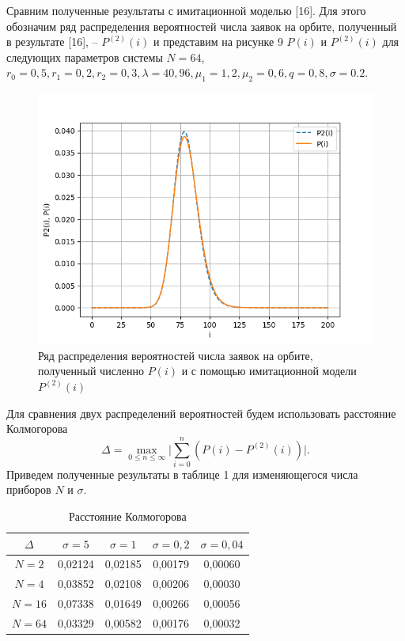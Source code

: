 Сравним полученные результаты с имитационной моделью [16]. Для этого обозначим ряд распределения вероятностей числа заявок на орбите, полученный в результате [16], -- $P^{(2)}(i)$ и представим на рисунке 9 $P(i)$  и $P^{(2)}(i)$ для следующих параметров системы $N=64$, $r_{0}=0,5, r_{1}=0,2, r_{2}=0,3, \lambda=40,96, \mu_{1}=1,2, \mu_{2}=0,6 , q=0,8, \sigma=0.2.$
\begin{figure}[H]
	\centering
	\includegraphics[width=0.6\linewidth]{pic64_0_2.png} 
	\caption{Ряд распределения вероятностей числа заявок на орбите, полученный численно $P(i)$ и с помощью имитационной модели $P^{(2)}(i)$}
	\label{ris:experimcoded}
\end{figure}
Для сравнения двух распределений вероятностей будем использовать расстояние Колмогорова
\begin{equation*}
	\Delta=\max_{0 \leq  n \leq  \infty}\bigg|\sum_{i=0}^{n}(P(i)-P^{(2)}(i))\bigg|.
\end{equation*}
Приведем полученные результаты в таблице 1 для изменяющегося числа приборов $N$ и $\sigma$.

\captionsetup[table]{justification=raggedright}
\begin{table}[h]
	\caption{Расстояние Колмогорова}
	 \centering 
	\begin{tabular}{ | c | c | c | c | c | }
		\hline
		$\Delta$ & $\sigma=5$ & $\sigma=1$ & $\sigma=0,2$  & $\sigma=0,04$ \\ \hline
		$N=2$ & 0,02124 & 0,02185 & 0,00179 & 0,00060 \\ \hline
		$N=4$ & 0,03852 & 0,02108 & 0,00206 & 0,00030 \\ \hline
		$N=16$ & 0,07338 & 0,01649 & 0,00266 & 0,00056 \\ \hline
		$N=64$ & 0,03329 & 0,00582 & 0,00176 & 0,00032 \\ 
		\hline
	\end{tabular}
\end{table}
